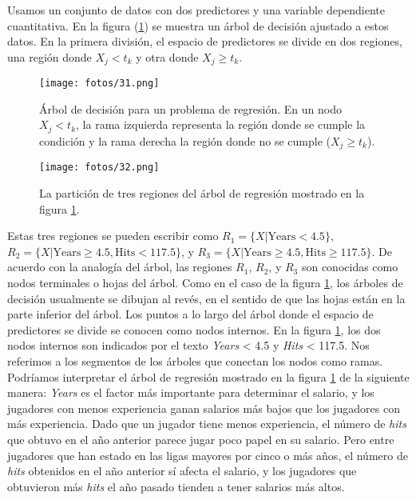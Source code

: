 \begin{example}
Usamos un conjunto de datos con dos predictores y una variable dependiente cuantitativa. En la figura (\ref{fig:6.1}) se muestra un árbol de decisión ajustado a estos datos. En la primera división, el espacio de predictores se divide en dos regiones, una región donde $X_j < t_k$ y otra donde $X_j \geq t_k$. 
\begin{figure}[h]
\centering
\texttt{[image: fotos/31.png]}
\caption{Árbol de decisión para un problema de regresión. En un nodo $X_j < t_k$, la rama izquierda representa la región donde se cumple la condición y la rama derecha la región donde no se cumple ($X_j \geq t_k$).}
\label{fig:6.1}
\end{figure}

\begin{figure}[h]
\centering
\texttt{[image: fotos/32.png]}
\caption{La partición de tres regiones del árbol de regresión mostrado en la figura \ref{fig:6.1}.}
\label{fig:6.2}
\end{figure}
Estas tres regiones se pueden escribir como $R_1 = \{X | \text{Years} < 4.5\}$, $R_2 = \{X | \text{Years} \geq 4.5, \text{Hits} < 117.5\}$, y $R_3 = \{X | \text{Years} \geq 4.5, \text{Hits} \geq 117.5\}$. De acuerdo con la analogía del árbol, las regiones $R_1$, $R_2$, y $R_3$ son conocidas como nodos terminales o hojas del árbol. Como en el caso de la figura \ref{fig:6.1}, los árboles de decisión usualmente se dibujan al revés, en el sentido de que las hojas están en la parte inferior del árbol. Los puntos a lo largo del árbol donde el espacio de predictores se divide se conocen como nodos internos. En la figura \ref{fig:6.1}, los dos nodos internos son indicados por el texto \textit{Years} < 4.5 y \textit{Hits} < 117.5. Nos referimos a los segmentos de los árboles que conectan los nodos como ramas. Podríamos interpretar el árbol de regresión mostrado en la figura \ref{fig:6.1} de la siguiente manera: \textit{Years} es el factor más importante para determinar el salario, y los jugadores con menos experiencia ganan salarios más bajos que los jugadores con más experiencia. Dado que un jugador tiene menos experiencia, el número de \textit{hits} que obtuvo en el año anterior parece jugar poco papel en su salario. Pero entre jugadores que han estado en las ligas mayores por cinco o más años, el número de \textit{hits} obtenidos en el año anterior sí afecta el salario, y los jugadores que obtuvieron más \textit{hits} el año pasado tienden a tener salarios más altos. 
\end{example}



